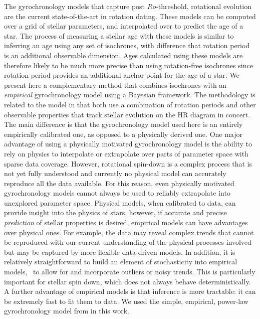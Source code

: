 The gyrochronology models that capture post $Ro$-threshold, rotational
evolution \citep{vansaders2016} are the current state-of-the-art in rotation
dating.
These models can be computed over a grid of stellar parameters, and
interpolated over to predict the age of a star.
The process of measuring a stellar age with these models is similar to
inferring an age using any set of isochrones, with difference that rotation
period is an additional observable dimension.
Ages calculated using these models are therefore likely to be much more
precise than using rotation-free isochrones since rotation period provides an
additional anchor-point for the age of a star.
We present here a complementary method that combines isochrones with an {\it
empirical} gyrochronology model using a Bayesian framework.
The methodology is related to the \citet{vansaders2016} model in that both use
a combination of rotation periods and other observable properties that track
stellar evolution on the HR diagram in concert.
The main difference is that the gyrochronology model used here is an entirely
empirically calibrated one, as opposed to a physically derived one.
One major advantage of using a physically motivated gyrochronology model is
the ability to rely on physics to interpolate or extrapolate over parts of
parameter space with sparse data coverage.
However, rotational spin-down is a complex process that is not yet fully
understood and currently no physical model can accurately reproduce all the
data available.
For this reason, even physically motivated gyrochronology models cannot always
be used to reliably extrapolate into unexplored parameter space.
Physical models, when calibrated to data, can provide insight into the physics
of stars, however, if accurate and precise {\it prediction} of stellar
properties is desired, empirical models can have advantages over physical
ones.
For example, the data may reveal complex trends that cannot be reproduced with
our current understanding of the physical processes involved but may be
captured by more flexible data-driven models.
In addition, it is relatively straightforward to build an element of
stochasticity into empirical models, \ie\ to allow for and incorporate
outliers or noisy trends.
This is particularly important for stellar spin down, which does not always
behave deterministically.
A further advantage of empirical models is that inference is more tractable:
it can be extremely fast to fit them to data.
We used the simple, empirical, power-law gyrochronology model from
\citet{angus2015} in this work.
